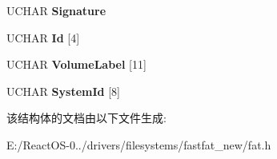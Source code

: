 \begin{DoxyCompactItemize}
U\+C\+H\+AR {\bfseries Signature}
\item 
\mbox{\label{struct___p_a_c_k_e_d___b_o_o_t___s_e_c_t_o_r___e_x_abc092b5a6fda14d764ee34550c68e3e2}} 
U\+C\+H\+AR {\bfseries Id} \mbox{[}4\mbox{]}
\item 
\mbox{\label{struct___p_a_c_k_e_d___b_o_o_t___s_e_c_t_o_r___e_x_a544534f49702186c90e1b76699249fb5}} 
U\+C\+H\+AR {\bfseries Volume\+Label} \mbox{[}11\mbox{]}
\item 
\mbox{\label{struct___p_a_c_k_e_d___b_o_o_t___s_e_c_t_o_r___e_x_a21b26ce346c9413987d3a3a7ab5f8941}} 
U\+C\+H\+AR {\bfseries System\+Id} \mbox{[}8\mbox{]}
\end{DoxyCompactItemize}


该结构体的文档由以下文件生成\+:\begin{DoxyCompactItemize}
\item 
E\+:/\+React\+O\+S-\/0../drivers/filesystems/fastfat\+\_\+new/fat.\+h\end{DoxyCompactItemize}
